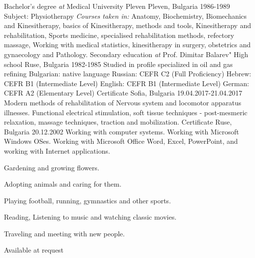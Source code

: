 \documentclass[11pt, a4paper]{awesome-cv}
\newcommand*{\sectiondir}{resume/}
\begin{document}
\vspace{+3mm}
\cventry
{Bachelor's degree \textit{at} Medical University Pleven}
{Pleven, Bulgaria 1986-1989}
{
Subject: Physiotherapy
\newline
\textit{Courses taken in:} Anatomy, Biochemistry, Biomechanics and Kinesitherapy, basics of Kinesitherapy, methods and tools, Kinesitherapy and rehabilitation, Sports medicine, specialised rehabilitation methods, refectory massage, Working with medical statistics, kinesitherapy in surgery, obstetrics and gynaecology and Pathology.
}
\vspace{+3mm}
\cventry
{Secondary education \textit{at} Prof. Dimitar Balarev" High school}
{Ruse, Bulgaria 1982-1985}
{
Studied in profile specialized in oil and gas refining
}
\vspace{+3mm}
\cventrytwo
{
Bulgarian: native language
\newline
Russian: CEFR C2 (Full Proficiency)
\newline
Hebrew: CEFR B1 (Intermediate Level)
\newline
English: CEFR B1 (Intermediate Level)
\newline
German: CEFR A2 (Elementary Level)
}
\cventry
{Certificate}
{Sofia, Bulgaria 19.04.2017-21.04.2017}
{
Modern methods of rehabilitation of Nervous system and locomotor apparatus illnesses. Functional electrical stimulation, soft tissue techniques - post-mesmeric relaxation, massage techniques,  traction and mobilization.
}
\vspace{+3mm}
\cventry
{Certificate}
{Ruse, Bulgaria 20.12.2002}
{
Working with computer systems. Working with Microsoft Windows OSes. Working with Microsoft Office Word, Excel, PowerPoint, and working with Internet applications. 
}
\cventrytwo
{
\begin{cvitemsone}
\item {Gardening and growing flowers.}
\item {Adopting animals and caring for them.}
\item {Playing football, running, gymnastics and other sports.}
\item {Reading, Listening to music and watching classic movies.}
\item {Traveling and meeting with new people.}
\end{cvitemsone}
}

\vspace{+1mm}
\cventrytwo
{Available at request}
\end{document}
